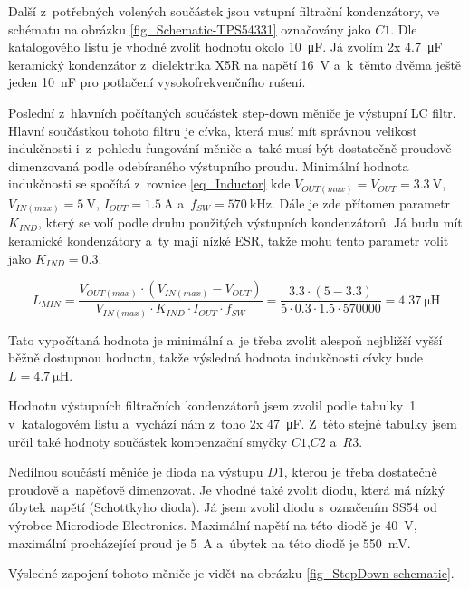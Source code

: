 Další z~potřebných volených součástek jsou vstupní filtrační kondenzátory, ve schématu na obrázku \ref{fig_Schematic-TPS54331} označovány jako $C1$. Dle katalogového listu je vhodné zvolit hodnotu okolo \SI{10}{\micro\farad}. Já zvolím 2x \SI{4,7}{\micro\farad} keramický kondenzátor z~dielektrika X5R na napětí \SI{16}{\volt} a~k~těmto dvěma ještě jeden \SI{10}{\nano\farad} pro potlačení vysokofrekvenčního rušení.

Poslední z~hlavních počítaných součástek step-down měniče je výstupní LC filtr. Hlavní součástkou tohoto filtru je cívka, která musí mít správnou velikost indukčnosti i~z~pohledu fungování měniče a~také musí být dostatečně proudově dimenzovaná podle odebíraného výstupního proudu. Minimální hodnota indukčnosti se spočítá z~rovnice \ref{eq_Inductor} kde $V_{OUT(max)}=V_{OUT}=\SI{3,3}{\volt}$, $V_{IN(max)}=\SI{5}{\volt}$, $I_{OUT}=\SI{1,5}{\ampere}$ a~$f_{SW}=\SI{570}{\kilo\hertz}$. Dále je zde přítomen parametr $K_{IND}$, který se volí podle druhu použitých výstupních kondenzátorů. Já budu mít keramické kondenzátory a~ty mají nízké ESR, takže mohu tento parametr volit jako $K_{IND}=0.3$.

\begin{equation}
    L_{MIN}=\frac{V_{OUT(max)}\cdot (V_{IN(max)}-V_{OUT})}{V_{IN(max)}\cdot K_{IND}\cdot I_{OUT}\cdot f_{SW}}=\frac{3.3\cdot (5-3.3)}{5\cdot 0.3\cdot 1.5 \cdot 570000}=\SI{4,37}{\micro\henry}
    \label{eq_Inductor}
\end{equation}

Tato vypočítaná hodnota je minimální a~je třeba zvolit alespoň nejbližší vyšší běžně dostupnou hodnotu, takže výsledná hodnota indukčnosti cívky bude $L=\SI{4,7}{\micro\henry}$. 

Hodnotu výstupních filtračních kondenzátorů jsem zvolil podle tabulky~1 v~katalogovém listu \cite{dat_TPS54331} a~vychází nám z~toho 2x \SI{47}{\micro\farad}. Z~této stejné tabulky jsem určil také hodnoty součástek kompenzační smyčky $C1$,$C2$ a~$R3$.

Nedílnou součástí měniče je dioda na výstupu $D1$, kterou je třeba dostatečně proudově a~napěťově dimenzovat. Je vhodné také zvolit diodu, která má nízký úbytek napětí (Schottkyho dioda). Já jsem zvolil diodu s~označením SS54 od výrobce Microdiode Electronics. Maximální napětí na této diodě je \SI{40}{\volt}, maximální procházející proud je \SI{5}{\ampere} a~úbytek na této diodě je \SI{550}{\milli\volt}.

Výsledné zapojení tohoto měniče je vidět na obrázku \ref{fig_StepDown-schematic}.

